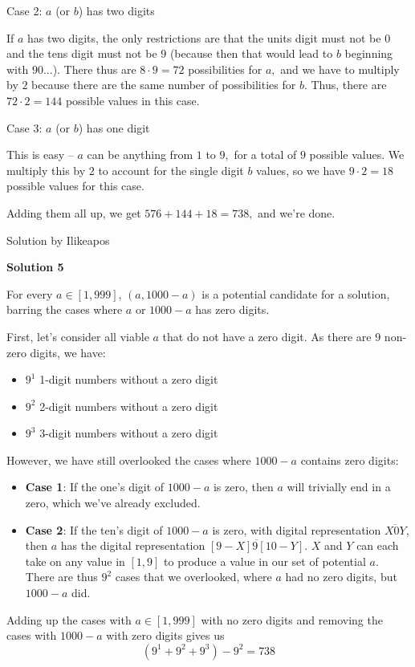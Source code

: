 \begin{enumerate}
 Case 2: $a$ (or $b$) has two digits 

 If $a$ has two digits, the only restrictions are that the units digit must not be $0$ and the tens digit must not be $9$ (because then that would lead to $b$ beginning with $90...$). There thus are $8 \cdot 9 = 72$ possibilities for $a,$ and we have to multiply by $2$ because there are the same number of possibilities for $b.$ Thus, there are $72 \cdot 2 = 144$ possible values in this case. 

 Case 3: $a$ (or $b$) has one digit

 This is easy -- $a$ can be anything from $1$ to $9,$ for a total of $9$ possible values. We multiply this by $2$ to account for the single digit $b$ values, so we have $9 \cdot 2 = 18$ possible values for this case. 

 Adding them all up, we get $576 + 144 + 18 = \boxed{738},$ and we're done. 

 Solution by Ilikeapos

 



\textbf{Solution 5}

For every $a \in [1, 999]$, $(a, 1000 - a)$ is a potential candidate for a solution, barring the cases where $a$ or $1000 -a$ has zero digits.

 First, let's consider all viable $a$ that do not have a zero digit. As there are 9 non-zero digits, we have:

 
            \begin{itemize}
        \item $9^1$ 1-digit numbers without a zero digit
        \item $9^2$ 2-digit numbers without a zero digit
        \item $9^3$ 3-digit numbers without a zero digit
            \end{itemize}
            However, we have still overlooked the cases where $1000 - a$ contains zero digits:

 
            \begin{itemize}
        \item \textbf{Case 1}: If the one's digit of $1000 - a$ is zero, then $a$ will trivially end in a zero, which we've already excluded.
        \item \textbf{Case 2}: If the ten's digit of $1000 - a$ is zero, with digital representation $\overline{X0Y}$, then $a$ has the digital representation $\overline{[9-X]9[10-Y]}$. $X$ and $Y$ can each take on any value in $[1, 9]$ to produce a value in our set of potential $a$. There are thus $9^2$ cases that we overlooked, where $a$ had no zero digits, but $1000 - a$ did.
            \end{itemize}
            Adding up the cases with $a \in [1, 999]$ with no zero digits and removing the cases with $1000 - a$ with zero digits gives us 
 \[(9^1 + 9^2 + 9^3) - 9^2 = \boxed{738}\]





\end{enumerate}
